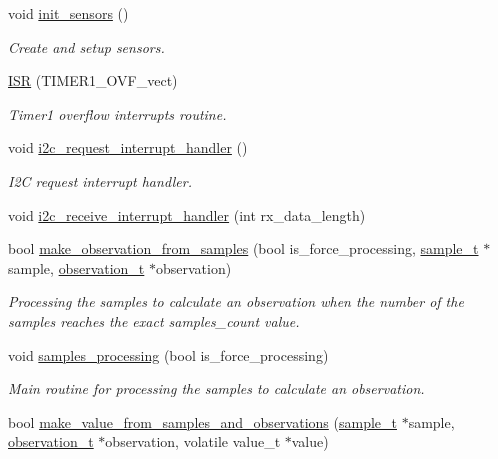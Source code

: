 \begin{DoxyCompactItemize}
void \hyperlink{i2c-th_8ino_ac74850003fab6eb3269bfe043d0f939c}{init\+\_\+sensors} ()
\begin{DoxyCompactList}\small\item\em Create and setup sensors. \end{DoxyCompactList}\item 
\hyperlink{i2c-th_8ino_ab16889ae984b9b798989a0d239283cac}{I\+SR} (T\+I\+M\+E\+R1\+\_\+\+O\+V\+F\+\_\+vect)
\begin{DoxyCompactList}\small\item\em Timer1 overflow interrupts routine. \end{DoxyCompactList}\item 
void \hyperlink{i2c-th_8ino_ac816bd8aafe77e7a571574c8a26eead5}{i2c\+\_\+request\+\_\+interrupt\+\_\+handler} ()
\begin{DoxyCompactList}\small\item\em I2C request interrupt handler. \end{DoxyCompactList}\item 
void \hyperlink{i2c-th_8ino_a6e27532df66f6bf186654355def5c9af}{i2c\+\_\+receive\+\_\+interrupt\+\_\+handler} (int rx\+\_\+data\+\_\+length)
\item 
bool \hyperlink{i2c-th_8ino_a1c5769e114267b210fb3812064d01dd0}{make\+\_\+observation\+\_\+from\+\_\+samples} (bool is\+\_\+force\+\_\+processing, \hyperlink{structsample__t}{sample\+\_\+t} $\ast$sample, \hyperlink{structobservation__t}{observation\+\_\+t} $\ast$observation)
\begin{DoxyCompactList}\small\item\em Processing the samples to calculate an observation when the number of the samples reaches the exact samples\+\_\+count value. \end{DoxyCompactList}\item 
void \hyperlink{i2c-th_8ino_aba0fc91d6c2829df00a9d5fe2b921c90}{samples\+\_\+processing} (bool is\+\_\+force\+\_\+processing)
\begin{DoxyCompactList}\small\item\em Main routine for processing the samples to calculate an observation. \end{DoxyCompactList}\item 
bool \hyperlink{i2c-th_8ino_ab301e4d552826ef91458f52963949a1d}{make\+\_\+value\+\_\+from\+\_\+samples\+\_\+and\+\_\+observations} (\hyperlink{structsample__t}{sample\+\_\+t} $\ast$sample, \hyperlink{structobservation__t}{observation\+\_\+t} $\ast$observation, volatile value\+\_\+t $\ast$value)

\end{DoxyCompactItemize}
